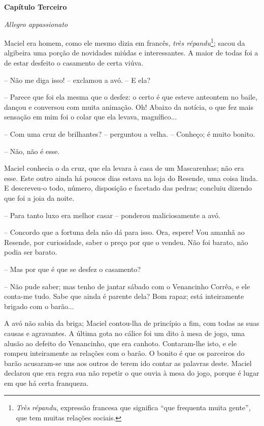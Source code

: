 \textbf{Capítulo Terceiro}

\emph{Allegro appassionato}

Maciel era homem, como ele mesmo dizia em francês, \emph{très
répandu}\footnote{\emph{Très répandu}, expressão francesa que significa
  ``que frequenta muita gente'', que tem muitas relações sociais.};
sacou da algibeira uma porção de novidades miúdas e interessantes. A
maior de todas foi a de estar desfeito o casamento de certa viúva.

-- Não me diga isso! -- exclamou a avó. -- E ela?

-- Parece que foi ela mesma que o desfez: o certo é que esteve anteontem
no baile, dançou e conversou com muita animação. Oh! Abaixo da notícia,
o que fez mais sensação em mim foi o colar que ela levava, magnífico...

-- Com uma cruz de brilhantes? -- perguntou a velha. -- Conheço; é muito
bonito.

-- Não, não é esse.

Maciel conhecia o da cruz, que ela levara à casa de um Mascarenhas; não
era esse. Este outro ainda há poucos dias estava na loja do Resende, uma
coisa linda. E descreveu-o todo, número, disposição e facetado das
pedras; concluiu dizendo que foi a joia da noite.

-- Para tanto luxo era melhor casar -- ponderou maliciosamente a avó.

-- Concordo que a fortuna dela não dá para isso. Ora, espere! Vou amanhã
ao Resende, por curiosidade, saber o preço por que o vendeu. Não foi
barato, não podia ser barato.

-- Mas por que é que se desfez o casamento?

-- Não pude saber; mas tenho de jantar sábado com o Venancinho Corrêa, e
ele conta-me tudo. Sabe que ainda é parente dela? Bom rapaz; está
inteiramente brigado com o barão...

A avó não sabia da briga; Maciel contou-lha de princípio a fim, com
todas as suas causas e agravantes. A última gota no cálice foi um dito à
mesa de jogo, uma alusão ao defeito do Venancinho, que era canhoto.
Contaram-lhe isto, e ele rompeu inteiramente as relações com o barão. O
bonito é que os parceiros do barão acusaram-se uns aos outros de terem
ido contar as palavras deste. Maciel declarou que era regra sua não
repetir o que ouvia à mesa do jogo, porque é lugar em que há certa
franqueza.

